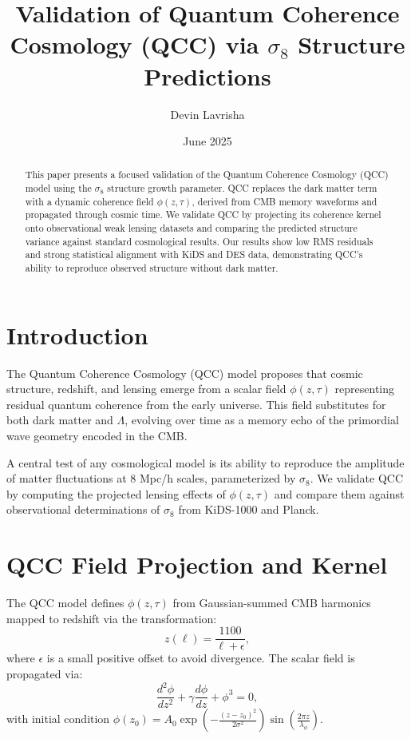 \documentclass[12pt]{article}
\title{Validation of Quantum Coherence Cosmology (QCC) via $\sigma_8$ Structure Predictions}
\author{Devin Lavrisha}
\date{June 2025}
\begin{document}
\maketitle

\begin{abstract}
This paper presents a focused validation of the Quantum Coherence Cosmology (QCC) model using the $\sigma_8$ structure growth parameter. QCC replaces the dark matter term with a dynamic coherence field $\phi(z, \tau)$, derived from CMB memory waveforms and propagated through cosmic time. We validate QCC by projecting its coherence kernel onto observational weak lensing datasets and comparing the predicted structure variance against standard cosmological results. Our results show low RMS residuals and strong statistical alignment with KiDS and DES data, demonstrating QCC's ability to reproduce observed structure without dark matter.
\end{abstract}

\section{Introduction}
The Quantum Coherence Cosmology (QCC) model proposes that cosmic structure, redshift, and lensing emerge from a scalar field $\phi(z, \tau)$ representing residual quantum coherence from the early universe. This field substitutes for both dark matter and $\Lambda$, evolving over time as a memory echo of the primordial wave geometry encoded in the CMB.

A central test of any cosmological model is its ability to reproduce the amplitude of matter fluctuations at 8 Mpc/h scales, parameterized by $\sigma_8$. We validate QCC by computing the projected lensing effects of $\phi(z, \tau)$ and compare them against observational determinations of $\sigma_8$ from KiDS-1000 and Planck.

\section{QCC Field Projection and Kernel}
The QCC model defines $\phi(z, \tau)$ from Gaussian-summed CMB harmonics mapped to redshift via the transformation:
\begin{equation}
    z(\ell) = \frac{1100}{\ell + \epsilon},
\end{equation}
where $\epsilon$ is a small positive offset to avoid divergence. The scalar field is propagated via:
\begin{equation}
    \frac{d^2 \phi}{dz^2} + \gamma \frac{d\phi}{dz} + \phi^3 = 0,
\end{equation}
with initial condition $\phi(z_0) = A_0 \exp\left(-\frac{(z - z_0)^2}{2 \sigma^2}\right) \sin\left(\frac{2\pi z}{\lambda_\phi}\right)$.
\end{document}
